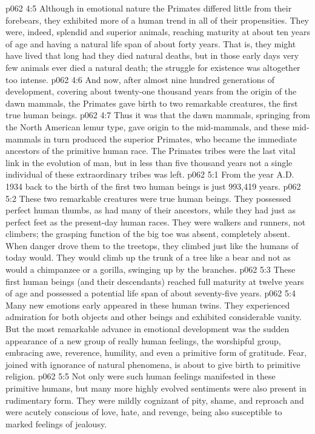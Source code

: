 \vs p062 4:5 Although in emotional nature the Primates differed little from their forebears, they exhibited more of a human trend in all of their propensities. They were, indeed, splendid and superior animals, reaching maturity at about ten years of age and having a natural life span of about forty years. That is, they might have lived that long had they died natural deaths, but in those early days very few animals ever died a natural death; the struggle for existence was altogether too intense.
\vs p062 4:6 And now, after almost nine hundred generations of development, covering about twenty\hyp{}one thousand years from the origin of the dawn mammals, the Primates  gave birth to two remarkable creatures, the first true human beings.
\vs p062 4:7 \pc Thus it was that the dawn mammals, springing from the North American lemur type, gave origin to the mid\hyp{}mammals, and these mid\hyp{}mammals in turn produced the superior Primates, who became the immediate ancestors of the primitive human race. The Primates tribes were the last vital link in the evolution of man, but in less than five thousand years not a single individual of these extraordinary tribes was left.
\vs p062 5:1 From the year A.D.\,1934 back to the birth of the first two human beings is just 993,419 years.
\vs p062 5:2 These two remarkable creatures were true human beings. They possessed perfect human thumbs, as had many of their ancestors, while they had just as perfect feet as the present\hyp{}day human races. They were walkers and runners, not climbers; the grasping function of the big toe was absent, completely absent. When danger drove them to the treetops, they climbed just like the humans of today would. They would climb up the trunk of a tree like a bear and not as would a chimpanzee or a gorilla, swinging up by the branches.
\vs p062 5:3 These first human beings (and their descendants) reached full maturity at twelve years of age and possessed a potential life span of about seventy\hyp{}five years.
\vs p062 5:4 Many new emotions early appeared in these human twins. They experienced admiration for both objects and other beings and exhibited considerable vanity. But the most remarkable advance in emotional development was the sudden appearance of a new group of really human feelings, the worshipful group, embracing awe, reverence, humility, and even a primitive form of gratitude. Fear, joined with ignorance of natural phenomena, is about to give birth to primitive religion.
\vs p062 5:5 Not only were such human feelings manifested in these primitive humans, but many more highly evolved sentiments were also present in rudimentary form. They were mildly cognizant of pity, shame, and reproach and were acutely conscious of love, hate, and revenge, being also susceptible to marked feelings of jealousy.
